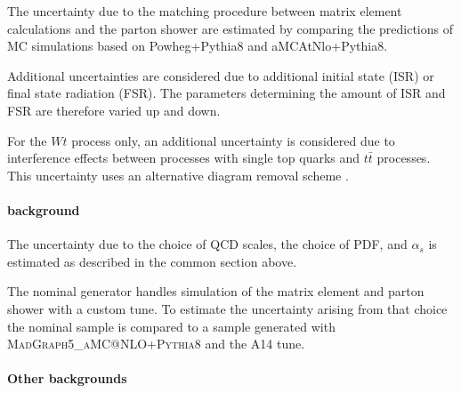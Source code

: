 

The uncertainty due to the matching procedure between matrix element calculations and the parton shower are estimated by comparing the predictions of MC simulations based on Powheg+Pythia8 and aMCAtNlo+Pythia8. 

Additional uncertainties are considered due to additional initial state (ISR) or final state radiation (FSR). 
The parameters determining the amount of ISR and FSR are therefore varied up and down. 

For the $Wt$ process only, an additional uncertainty is considered due to interference effects between processes with single top quarks and $t\bar{t}$ processes. This uncertainty uses an alternative diagram removal scheme \cite{Frixione:2008yi}. %


\paragraph{\Ztautau background}

The uncertainty due to the choice of QCD scales, the choice of PDF, and  $\alpha_s$ is estimated as described in the common section above. 

The nominal  generator handles simulation of the matrix element and parton shower with a custom tune. To estimate the uncertainty arising from that choice the nominal sample is compared to a sample generated with \textsc{MadGraph5\_aMC@NLO+Pythia8} and the A14 tune. 


\paragraph{Other backgrounds}



